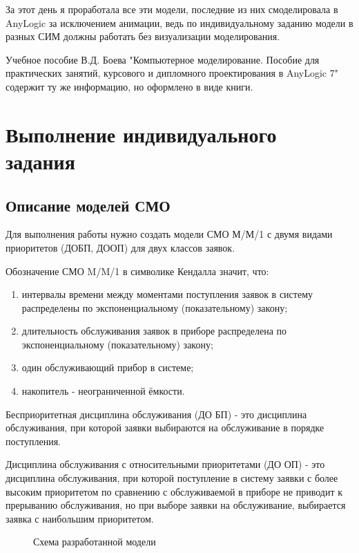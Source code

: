 \documentclass[a4paper,14pt]{report} %
\begin{document}
За этот день я проработала все эти модели, последние из них смоделировала в AnyLogic за исключением анимации, ведь по индивидуальному заданию модели в разных СИМ должны работать без визуализации моделирования.

Учебное пособие В.Д. Боева "Компьютерное моделирование. Пособие для практических занятий, курсового и дипломного проектирования в AnyLogic 7" содержит ту же информацию, но оформлено в виде книги.

\chapter{Выполнение индивидуального задания}
\section{Описание моделей СМО}
Для выполнения работы нужно создать модели СМО М/М/1 с двумя видами приоритетов (ДОБП, ДООП) для двух классов заявок. 

Обозначение СМО M/M/1  в символике Кендалла значит, что:
\begin{enumerate} %
\item интервалы времени между моментами поступления заявок в систему распределены по экспоненциальному (показательному) закону;
\item длительность обслуживания заявок в приборе распределена по экспоненциальному (показательному) закону;
\item один обслуживающий прибор в системе;
\item накопитель - неограниченной ёмкости.
\end{enumerate}

Бесприоритетная дисциплина обслуживания (ДО БП) - это дисциплина обслуживания, при которой заявки выбираются на обслуживание в порядке поступления.

Дисциплина обслуживания с относительными приоритетами (ДО ОП) - это дисциплина обслуживания, при которой поступление в систему заявки с более высоким приоритетом по сравнению с обслуживаемой в приборе не приводит к прерыванию обслуживания, но при выборе заявки на обслуживание, выбирается заявка с наибольшим приоритетом. 

\begin{figure}[h] %
\caption{Схема разработанной модели}
\label{ris:model}
\end{figure} %
\end{document}

